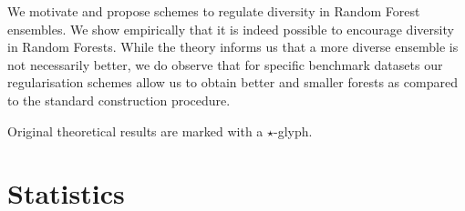 \documentclass[
	twoside=false, %
]{kaobook}
\begin{document}
We motivate and propose schemes to regulate diversity in Random Forest ensembles. We show empirically that it is indeed possible to encourage diversity in Random Forests. While the theory informs us that a more diverse ensemble is not necessarily better, we do observe that for specific benchmark datasets our regularisation schemes allow us to obtain better and smaller forests as compared to the standard construction procedure.

Original theoretical results are marked with a $\star$-glyph. 






\section{Statistics}
\label{sec:statistics}
\end{document}
